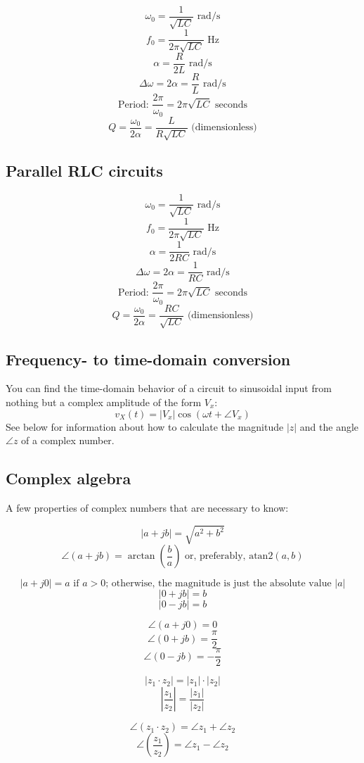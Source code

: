 \[ \omega_0 = \frac{1}{\sqrt{LC}} \text{ rad/s} \]
\[ f_0 = \frac{1}{2\pi \sqrt{LC}} \text { Hz} \]
\[ \alpha = \frac{R}{2L} \text{ rad/s} \]
\[ \Delta \omega = 2\alpha = \frac{R}{L} \text { rad/s} \]
\[ \text{Period: } \frac{2\pi}{\omega_0} = 2\pi \sqrt{LC} \text { seconds} \]
\[ Q = \frac{\omega_0}{2\alpha} = \frac{L}{R\sqrt{LC}} \text { (dimensionless)} \]

\subsection{Parallel RLC circuits}

\[ \omega_0 = \frac{1}{\sqrt{LC}} \text{ rad/s} \]
\[ f_0 = \frac{1}{2\pi \sqrt{LC}} \text { Hz} \]
\[ \alpha = \frac{1}{2RC} \text{ rad/s} \]
\[ \Delta \omega = 2\alpha = \frac{1}{RC} \text { rad/s} \]
\[ \text{Period: } \frac{2\pi}{\omega_0} = 2\pi \sqrt{LC} \text { seconds} \]
\[ Q = \frac{\omega_0}{2\alpha} = \frac{RC}{\sqrt{LC}} \text { (dimensionless)} \]

\subsection{Frequency- to time-domain conversion}
You can find the time-domain behavior of a circuit to sinusoidal input from nothing but a complex amplitude of the form $V_x$:
\[ v_X(t) = |V_x| \cos{(\omega t + \angle V_x)} \]
See below for information about how to calculate the magnitude $|z|$ and the angle $\angle z$ of a complex number.

\subsection{Complex algebra}
A few properties of complex numbers that are necessary to know:

\[ |a + jb| = \sqrt{a^2 + b^2} \]
\[ \angle (a + jb) = \arctan{(\frac{b}{a})} \text{ or, preferably, } \text{atan2}(a, b) \]

\[ |a + j0| = a \text { if $a > 0$; otherwise, the magnitude is just the absolute value } |a| \]
\[ |0 + jb| = b \]
\[ |0 - jb| = b \]

\[ \angle (a + j0) = 0 \]
\[ \angle (0 + jb) = \frac{\pi}{2} \]
\[ \angle (0 - jb) = -\frac{\pi}{2} \]

\[ |z_1 \cdot z_2| = |z_1| \cdot |z_2| \]
\[ \left| \frac{z_1}{z_2} \right| = \frac{|z_1|}{|z_2|} \]

\[ \angle (z_1 \cdot z_2) = \angle z_1 + \angle z_2 \]
\[ \angle \left( \frac{z_1}{z_2} \right) = \angle z_1 - \angle z_2 \]

